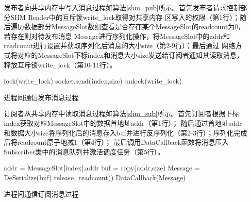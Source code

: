 
发布者向共享内存中写入消息过程如算法\ref{shm_pub}所示。首先发布者请求控制部分SHM Reader中的互斥锁write\_lock取得对共享内存
区写入的权限（第1行）；随后遍历数据部分MessageSlot数组查看是否存在某个MessageSlot的readcount为0，若存在则对待发布消息
Message进行序列化操作，将MessageSlot中的addr和readcount进行设置并获取序列化后消息的大小size（第2-9行）；最后通过
网络方式将对应的MessageSlot下标index和消息大小size发送给订阅者通知其读取消息，释放互斥锁write\_lock（第10-11行）。

\begin{algorithm}
  \small
  \SetAlgoLined
  lock(write\_lock)\;
  socket.send(index,size)\;
  unlock(write\_lock)\;
  \caption{进程间通信发布消息过程}
  \label{shm_pub}
\end{algorithm}

订阅者从共享内存中读取消息过程如算法\ref{shm_sub}所示。首先订阅者根据下标index获取对应MessageSlot中的数据首地址addr（第1行）；
随后通过首地址addr和数据大小size将序列化后的消息存入buf并进行反序列化（第2-3行）；序列化完成后将readcount原子地减1（第4行）；
最后调用DataCallback函数将消息压入Subscriber类中的消息队列并激活调度任务（第5行）。

\begin{algorithm}
  \small
  \SetAlgoLined
  addr = MessageSlot[index].addr\;
  buf = copy(addr,size)\;
  Message = DeSerialize(buf)\;
  release\_readcount()\;
  DataCallback(Message)\;

  \caption{进程间通信订阅消息过程}
  \label{shm_sub}
\end{algorithm}

